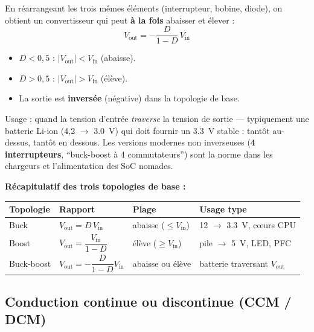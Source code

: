 \documentclass[12pt,a4paper,twoside]{book}
\begin{document}
\begin{formule}
En réarrangeant les trois mêmes éléments (interrupteur, bobine, diode), on obtient un convertisseur qui peut \textbf{à la fois} abaisser et élever :
\[
\boxed{V_{\text{out}} = -\frac{D}{1-D}\,V_{\text{in}}}
\]
\begin{itemize}[nosep]
\item $D < 0{,}5$ : $|V_{\text{out}}| < V_{\text{in}}$ (abaisse).
\item $D > 0{,}5$ : $|V_{\text{out}}| > V_{\text{in}}$ (élève).
\item La sortie est \textbf{inversée} (négative) dans la topologie de base.
\end{itemize}
Usage : quand la tension d'entrée \textit{traverse} la tension de sortie --- typiquement une batterie Li-ion (4,2 $\to$ \SI{3.0}{V}) qui doit fournir un \SI{3.3}{V} stable : tantôt au-dessus, tantôt en dessous. Les versions modernes non inverseuses (\textbf{4 interrupteurs}, ``buck-boost à 4 commutateurs'') sont la norme dans les chargeurs et l'alimentation des SoC nomades.
\end{formule}

\begin{pratique}
\textbf{Récapitulatif des trois topologies de base :}
\begin{center}
\renewcommand{\arraystretch}{1.4}
\begin{tabular}{p{2.6cm}p{2.8cm}p{3.0cm}p{3.6cm}}
\toprule
\textbf{Topologie} & \textbf{Rapport} & \textbf{Plage} & \textbf{Usage type} \\
\midrule
Buck & $V_{\text{out}} = D\,V_{\text{in}}$ & abaisse ($\leq V_{\text{in}}$) & 12 $\to$ \SI{3.3}{V}, cœurs CPU \\
Boost & $V_{\text{out}} = \dfrac{V_{\text{in}}}{1-D}$ & élève ($\geq V_{\text{in}}$) & pile $\to$ \SI{5}{V}, LED, PFC \\
Buck-boost & $V_{\text{out}} = -\dfrac{D}{1-D}V_{\text{in}}$ & abaisse ou élève & batterie traversant $V_{\text{out}}$ \\
\bottomrule
\end{tabular}
\end{center}
\end{pratique}

\subsection{Conduction continue ou discontinue (CCM / DCM)}
\end{document}
